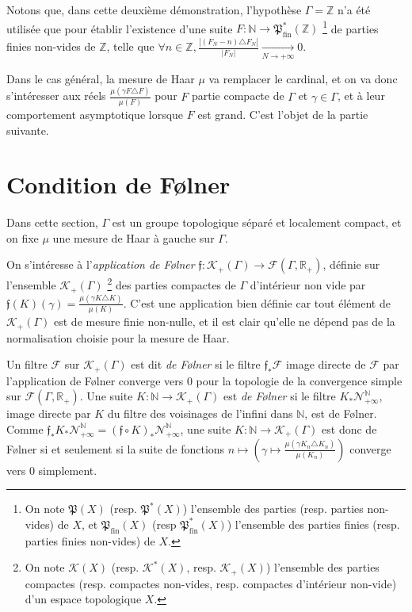 \documentclass[a4paper,12pt]{article}
\newcommand{\R}{\mathbb{R}}
\newcommand{\N}{\mathbb{N}}
\newcommand{\Z}{\mathbb{Z}}
\newcommand{\abs}[1]{\left\vert#1\right\vert}
\newcommand{\card}[1]{\abs{#1}}
\newcommand{\ssi}{si et seulement si }
\newcommand{\comp}{\circ}
\newcommand{\nhds}{\mathcal{N}}
\newcommand{\parts}{\mathfrak{P}}
\newcommand{\finparts}{\mathfrak{P}_{\mathrm{fin}}}
\begin{document}
Notons que, dans cette deuxième démonstration, l'hypothèse $\Gamma=\Z$ n'a été utilisée que pour établir l'existence d'une suite $F:\N\to\finparts^*(\Z)$ 
    \footnote{On note $\parts(X)$ (resp. $\parts^*(X)$) l'ensemble des parties (resp. parties non-vides) de $X$, et $\finparts(X)$ (resp $\finparts^*(X)$) 
    l'ensemble des parties finies (resp. parties finies non-vides) de $X$.}
de parties finies non-vides de $\Z$,
telle que $\forall n\in\Z, \frac{\card{(F_N-n)\triangle F_N}}{\card{F_N}} \xrightarrow[N\to+\infty]{} 0$. 

Dans le cas général, la mesure de Haar $\mu$ va remplacer le cardinal, et on va donc s'intéresser aux réels $\frac{\mu(\gamma F \triangle F)}{\mu(F)}$ 
pour $F$ partie compacte de $\Gamma$ et $\gamma\in\Gamma$, et à leur comportement asymptotique
lorsque $F$ est grand. C'est l'objet de la partie suivante.

\section{Condition de F\o{}lner}

Dans cette section, $\Gamma$ est un groupe topologique séparé et localement compact, et on fixe 
$\mu$ une mesure de Haar à gauche sur $\Gamma$.

On s'intéresse à l'\emph{application de F\o{}lner} $\mathfrak{f} : \mathcal{K}_+(\Gamma) \to \mathcal{F}(\Gamma, \R_+)$, définie sur l'ensemble 
$\mathcal{K}_+(\Gamma)$
\footnote{On note $\mathcal{K}(X)$ (resp. $\mathcal{K}^*(X)$, resp. $\mathcal{K}_+(X)$) l'ensemble des parties compactes 
(resp. compactes non-vides, resp. compactes d'intérieur non-vide) d'un espace topologique $X$. }
des parties compactes de $\Gamma$ d'intérieur non vide par $\mathfrak{f}(K)(\gamma) = \frac{\mu(\gamma K \triangle K)}{\mu(K)}$.
C'est une application bien définie car tout élément de $\mathcal{K}_+(\Gamma)$ est de mesure finie non-nulle,
et il est clair qu'elle ne dépend pas de la normalisation choisie pour la mesure de Haar.

Un filtre $\mathscr{F}$ sur $\mathcal{K}_+(\Gamma)$ est dit \emph{de F\o{}lner} si le filtre $\mathfrak{f}_*\mathscr{F}$ image directe 
de $\mathscr{F}$ par l'application de F\o{}lner converge vers $0$ pour la topologie de la convergence 
simple
sur $\mathcal{F}(\Gamma, \R_+)$.
Une suite $K:\N\to\mathcal{K}_+(\Gamma)$ est \emph{de F\o{}lner} si le filtre $K_*\nhds_{+\infty}^\N$, image directe par $K$ du filtre des
voisinages de l'infini dans $\N$, est de F\o{}lner. Comme $\mathfrak{f}_*K_*\nhds_{+\infty}^\N = (\mathfrak{f}\comp K)_*\nhds_{+\infty}^\N$,
une suite $K:\N\to\mathcal{K}_+(\Gamma)$ est donc de F\o{}lner \ssi la suite de fonctions
$n\mapsto\left(\gamma\mapsto\frac{\mu(\gamma K_n\triangle K_n)}{\mu(K_n)}\right)$ converge vers $0$
simplement.
\end{document}
